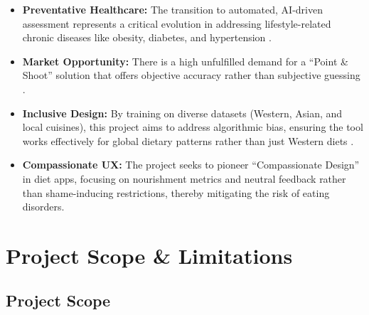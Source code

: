 \documentclass[fleqn,10pt]{SelfArx} %
\begin{document}
\begin{itemize}[noitemsep]
    \item \textbf{Preventative Healthcare:} The transition to automated, AI-driven assessment represents a critical evolution in addressing lifestyle-related chronic diseases like obesity, diabetes, and hypertension \cite{personalizednutrition2024}.

    \item \textbf{Market Opportunity:} There is a high unfulfilled demand for a ``Point \& Shoot'' solution that offers objective accuracy rather than subjective guessing \cite{marketsandmarkets2025}.

    \item \textbf{Inclusive Design:} By training on diverse datasets (Western, Asian, and local cuisines), this project aims to address algorithmic bias, ensuring the tool works effectively for global dietary patterns rather than just Western diets \cite{sciencedaily2024}.

    \item \textbf{Compassionate UX:} The project seeks to pioneer ``Compassionate Design'' in diet apps, focusing on nourishment metrics and neutral feedback rather than shame-inducing restrictions, thereby mitigating the risk of eating disorders.
\end{itemize}


\section{Project Scope \& Limitations}

\subsection{Project Scope}
\end{document}
